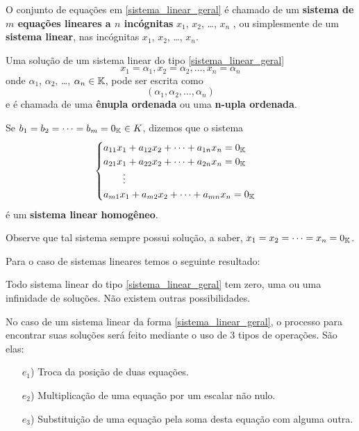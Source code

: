 O conjunto de equações em \eqref{sistema_linear_geral} é chamado de um  \textbf{sistema de $m$ equa\c{c}\~oes lineares  a $n$ inc\'ognitas} $x_1$, $x_2$, \dots, $x_n$ , ou simplesmente de um \textbf{sistema linear}, nas incógnitas  $x_1$, $x_2$, \dots, $x_n$.

Uma solução de um sistema linear do tipo \eqref{sistema_linear_geral}
\[
    x_1 = \alpha_1,  x_2 = \alpha_2,  \dots, x_n = \alpha_n
\]
onde $\alpha_1$, $\alpha_2$, \dots, $\alpha_n \in \mathbb{K}$,  pode ser escrita como
\[
    (\alpha_1, \alpha_2, \dots, \alpha_n)
\]
e é chamada de uma \textbf{ênupla ordenada} ou uma \textbf{n-upla ordenada}.


Se $b_1 = b_2 = \cdots = b_m = 0_{\mathbb{K}} \in K$,  dizemos que o sistema
\begin{equation}\label{sistemalinearhomogeneo}\index{Sistema Linear}
    \begin{cases}
        a_{11}x_1 + a_{12}x_2 + \cdots + a_{1n}x_n = 0_\cp{K}\\
        a_{21}x_1 + a_{22}x_2 + \cdots + a_{2n}x_n = 0_\cp{K}\\
        \qquad \vdots\\
        a_{m1}x_1 + a_{m2}x_2 + \cdots + a_{mn}x_n = 0_\cp{K}
    \end{cases}
\end{equation}
\'e um \textbf{sistema linear homog\^eneo}. 

Observe que tal sistema sempre possui solu\c{c}\~ao,  a saber, $x_1 = x_2 = \cdots = x_n = 0_{\mathbb{K}}$.

Para o caso de sistemas lineares temos o seguinte resultado:

\begin{teorema}
    Todo sistema linear do tipo \eqref{sistema_linear_geral} tem zero,  uma  ou uma infinidade de soluções.  Não existem outras possibilidades.
\end{teorema}

No caso de um sistema linear da forma \eqref{sistema_linear_geral},  o processo para encontrar suas soluções ser\'a feito mediante o uso de 3 tipos de opera\c{c}\~oes.  S\~ao elas:
\begin{itemize}
\item[$e_1$)] Troca da posi\c{c}\~ao de duas equa\c{c}\~oes.
\item[$e_2$)] Multiplica\c{c}\~ao de uma equa\c{c}\~ao por um escalar n\~ao nulo.
\item[$e_3$)] Substitui\c{c}\~ao de uma equa\c{c}\~ao pela soma desta equa\c{c}\~ao com alguma outra.
\end{itemize}

